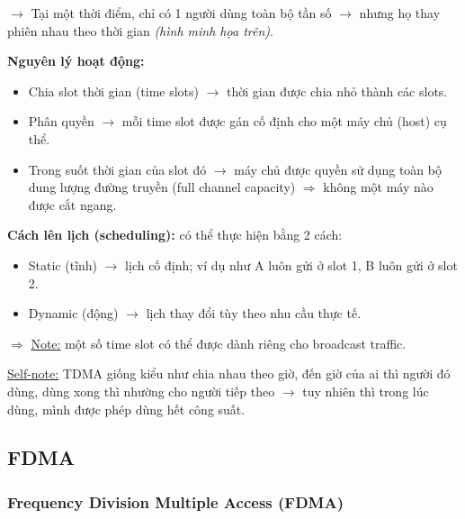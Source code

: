 \noindent
$\rightarrow$ Tại một thời điểm, chỉ có 1 người dùng toàn bộ tần số $\rightarrow$ nhưng họ thay phiên nhau theo thời gian \textit{(hình minh họa trên)}.
\medskip

\vspace{0.3cm}

\noindent
\textbf{Nguyên lý hoạt động:}

\begin{itemize}
    \item Chia slot thời gian (time slots) $\rightarrow$ thời gian được chia nhỏ thành các slots.
    \item Phân quyền $\rightarrow$ mỗi time slot được gán cố định cho một máy chủ (host) cụ thể.
    \item[$\rightarrow$] Trong suốt thời gian của slot đó $\rightarrow$ máy chủ được quyền sử dụng toàn bộ dung lượng đường truyền (full channel capacity) $\Rightarrow$ không một máy nào được cắt ngang.
\end{itemize}
\medskip

\noindent
\textbf{Cách lên lịch (scheduling):} có thể thực hiện bằng 2 cách:

\begin{itemize}
    \item Static (tĩnh) $\rightarrow$ lịch cố định; ví dụ như A luôn gửi ở slot 1, B luôn gửi ở slot 2.
    \item Dynamic (động) $\rightarrow$ lịch thay đổi tùy theo nhu cầu thực tế.
\end{itemize}
\medskip

\noindent
$\Rightarrow$ \underline{Note:} một số time slot có thể được dành riêng cho broadcast traffic.
\medskip

\vspace{0.3cm}

\noindent
\underline{Self-note:} TDMA giống kiểu như chia nhau theo giờ, đến giờ của ai thì người đó dùng, dùng xong thì nhường cho người tiếp theo $\rightarrow$ tuy nhiên thì trong lúc dùng, mình được phép dùng hết công suất.
\medskip

\subsection{FDMA}

\subsubsection{Frequency Division Multiple Access (FDMA)}

